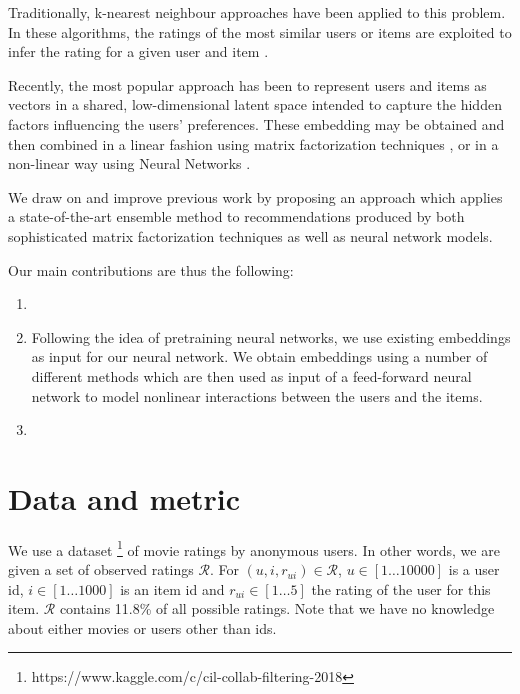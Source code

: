 \documentclass[10pt,conference,compsocconf]{IEEEtran}
\begin{document}
    
Traditionally, k-nearest neighbour approaches have been applied to this problem. In these algorithms, the ratings of the most similar users or items are exploited to infer the rating for a given user and item \cite{sarwar2001item}.

Recently, the most popular approach has been to represent users and items  as vectors in a shared, low-dimensional latent space intended to capture the hidden factors influencing the users' preferences. These embedding may be obtained and then combined in a linear fashion using matrix factorization techniques \cite{koren2009matrix}, or in a non-linear way using Neural Networks
\cite{he2017neural}.





We draw on and improve previous work by proposing an approach which applies a state-of-the-art ensemble method to recommendations produced by both sophisticated matrix factorization techniques as well as neural network models.

Our main contributions are thus the following: 
\begin{enumerate}
    \item %
    \item Following the idea of pretraining neural networks, we use existing embeddings as input for our neural network. We obtain embeddings using a number of different methods which are then used as input of a feed-forward neural network to model nonlinear interactions between the users and the items. 
    \item %
\end{enumerate}


\section{Data and metric}
We use a dataset \footnote{https://www.kaggle.com/c/cil-collab-filtering-2018} of movie ratings by anonymous users.
In other words, we are given a set of observed ratings $\mathcal{R}$. For $(u, i, r_{ui}) \in \mathcal{R}$, $u \in [1\dots10000]$ is a user id, $i \in [1\dots1000]$  is an item id and $r_{ui} \in [1\dots5]$ the rating of the user for this item. $\mathcal{R}$ contains 11.8\% of all possible ratings. Note that we have no knowledge about either movies or users other than ids.
\end{document}
